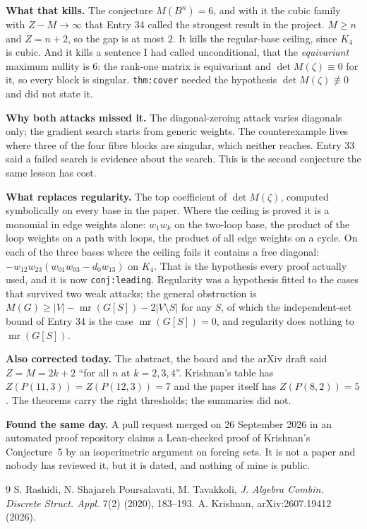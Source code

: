 \documentclass[12pt]{article}
\begin{document}
\textbf{What that kills.} The conjecture $M(B^n)=6$, and with it the cubic
family with $Z-M\to\infty$ that Entry 34 called the strongest result in the
project. $M\ge n$ and $Z=n+2$, so the gap is at most $2$. It kills the
regular-base ceiling, since $K_4$ is cubic. And it kills a sentence I had
called unconditional, that the \emph{equivariant} maximum nullity is $6$: the
rank-one matrix is equivariant and $\det M(\zeta)\equiv0$ for it, so every
block is singular. \texttt{thm:cover} needed the hypothesis
$\det M(\zeta)\not\equiv0$ and did not state it.

\textbf{Why both attacks missed it.} The diagonal-zeroing attack varies
diagonals only; the gradient search starts from generic weights. The
counterexample lives where three of the four fibre blocks are singular, which
neither reaches. Entry 33 said a failed search is evidence about the search.
This is the second conjecture the same lesson has cost.

\textbf{What replaces regularity.} The top coefficient of $\det M(\zeta)$,
computed symbolically on every base in the paper. Where the ceiling is proved
it is a monomial in edge weights alone: $w_1w_k$ on the two-loop base, the
product of the loop weights on a path with loops, the product of all edge
weights on a cycle. On each of the three bases where the ceiling fails it
contains a free diagonal: $-w_{12}w_{23}(w_{01}w_{03}-d_0w_{13})$ on $K_4$.
That is the hypothesis every proof actually used, and it is now
\texttt{conj:leading}. Regularity was a hypothesis fitted to the cases that
survived two weak attacks; the general obstruction is
$M(G)\ge|V|-\operatorname{mr}(G[S])-2|V\setminus S|$ for any $S$, of which the
independent-set bound of Entry 34 is the case $\operatorname{mr}(G[S])=0$, and
regularity does nothing to $\operatorname{mr}(G[S])$.

\textbf{Also corrected today.} The abstract, the board and the arXiv draft said
$Z=M=2k+2$ ``for all $n$ at $k=2,3,4$''. Krishnan's table has
$Z(P(11,3))=Z(P(12,3))=7$ and the paper itself has $Z(P(8,2))=5$. The theorems
carry the right thresholds; the summaries did not.

\textbf{Found the same day.} A pull request merged on 26 September 2026 in an
automated proof repository claims a Lean-checked proof of Krishnan's
Conjecture~5 by an isoperimetric argument on forcing sets. It is not a paper
and nobody has reviewed it, but it is dated, and nothing of mine is public.

\begin{thebibliography}{9}
 S. Rashidi, N. Shajareh Poursalavati, M. Tavakkoli,
\emph{J. Algebra Combin. Discrete Struct. Appl.} 7(2) (2020), 183--193.
 A. Krishnan, arXiv:2607.19412 (2026).
\end{thebibliography}
\end{document}
